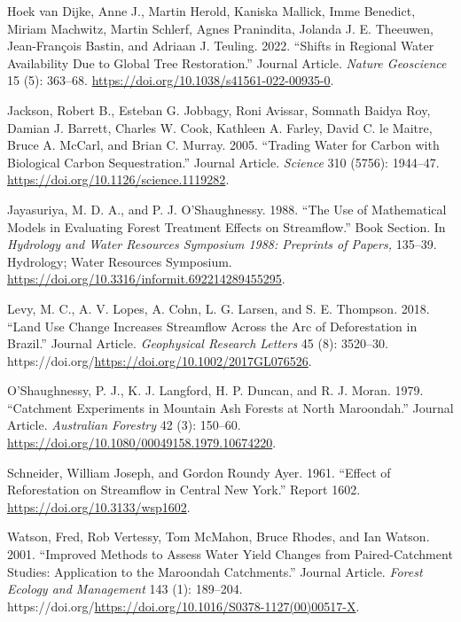 \documentclass[]{elsarticle} %
\newlength{\cslhangindent}
\newlength{\cslentryspacingunit} %
\newenvironment{CSLReferences}[2] %
 {%
  \setlength{\parindent}{0pt}
  \ifodd #1
  \let\oldpar\par
  \def\par{\hangindent=\cslhangindent\oldpar}
  \fi
  \setlength{\parskip}{#2\cslentryspacingunit}
 }%
 {}
\begin{document}
\begin{CSLReferences}{1}{0}
\leavevmode{}%
Hoek van Dijke, Anne J., Martin Herold, Kaniska Mallick, Imme Benedict, Miriam Machwitz, Martin Schlerf, Agnes Pranindita, Jolanda J. E. Theeuwen, Jean-François Bastin, and Adriaan J. Teuling. 2022. {``Shifts in Regional Water Availability Due to Global Tree Restoration.''} Journal Article. \emph{Nature Geoscience} 15 (5): 363--68. \url{https://doi.org/10.1038/s41561-022-00935-0}.

\leavevmode{}%
Jackson, Robert B., Esteban G. Jobbagy, Roni Avissar, Somnath Baidya Roy, Damian J. Barrett, Charles W. Cook, Kathleen A. Farley, David C. le Maitre, Bruce A. McCarl, and Brian C. Murray. 2005. {``Trading Water for Carbon with Biological Carbon Sequestration.''} Journal Article. \emph{Science} 310 (5756): 1944--47. \url{https://doi.org/10.1126/science.1119282}.

\leavevmode{}%
Jayasuriya, M. D. A., and P. J. O'Shaughnessy. 1988. {``The Use of Mathematical Models in Evaluating Forest Treatment Effects on Streamflow.''} Book Section. In \emph{Hydrology and Water Resources Symposium 1988: Preprints of Papers,} 135--39. Hydrology; Water Resources Symposium. \url{https://doi.org/10.3316/informit.692214289455295}.

\leavevmode{}%
Levy, M. C., A. V. Lopes, A. Cohn, L. G. Larsen, and S. E. Thompson. 2018. {``Land Use Change Increases Streamflow Across the Arc of Deforestation in Brazil.''} Journal Article. \emph{Geophysical Research Letters} 45 (8): 3520--30. https://doi.org/\url{https://doi.org/10.1002/2017GL076526}.

\leavevmode{}%
O'Shaughnessy, P. J., K. J. Langford, H. P. Duncan, and R. J. Moran. 1979. {``Catchment Experiments in Mountain Ash Forests at North Maroondah.''} Journal Article. \emph{Australian Forestry} 42 (3): 150--60. \url{https://doi.org/10.1080/00049158.1979.10674220}.

\leavevmode{}%
Schneider, William Joseph, and Gordon Roundy Ayer. 1961. {``Effect of Reforestation on Streamflow in Central New York.''} Report 1602. \url{https://doi.org/10.3133/wsp1602}.

\leavevmode{}%
Watson, Fred, Rob Vertessy, Tom McMahon, Bruce Rhodes, and Ian Watson. 2001. {``Improved Methods to Assess Water Yield Changes from Paired-Catchment Studies: Application to the Maroondah Catchments.''} Journal Article. \emph{Forest Ecology and Management} 143 (1): 189--204. https://doi.org/\url{https://doi.org/10.1016/S0378-1127(00)00517-X}.


\end{CSLReferences}
\end{document}
